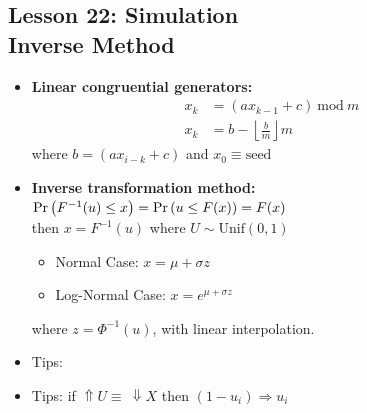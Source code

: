 \documentclass[10pt, french]{article}
\begin{document}
\begin{multicols*}{3}
\section*{Lesson 22: Simulation \\ Inverse Method}
\begin{itemize}[align=left,leftmargin=*]
    \item \textbf{Linear congruential generators:}
    \begin{align*}
        x_k &= (ax_{k-1}+c)\: \mathrm{mod}\: m \\
        x_k &= b - \left\lfloor \frac{b}{m} \right\rfloor m
    \end{align*}
    where $b = (ax_{i-k}+c)$ and $x_0\equiv\mathrm{seed}$
    \item \textbf{Inverse transformation method:}\\ $ \Pr \left( F^{-1}(u)\leq x \right) = \Pr \left( u\leq F(x) \right) = F(x) $ \\ then $x = F^{-1}(u)$ where $U \sim \mathrm{Unif}(0,1)$
    \begin{itemize}
        \item Normal Case: $x = \mu + \sigma z$
        \item Log-Normal Case: $x = e^{\mu + \sigma z}$
    \end{itemize}
    where $z = \Phi^{-1}(u)$, with linear interpolation.
    \item Tips: {\color{AppendixColor}}
    \item Tips: if $\Uparrow U \equiv\: \Downarrow X$ then $(1-u_i)\Rightarrow u_i$
\end{itemize}


\end{multicols*}
\end{document}
